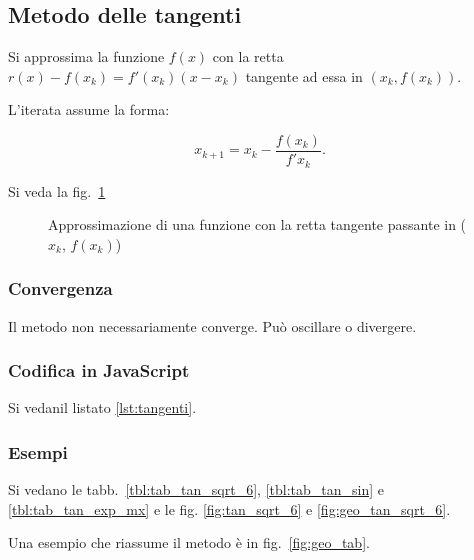 \subsection{Metodo delle tangenti}

Si approssima la funzione $f(x)$ con la retta $r(x) - f(x_k) = f'(x_k) (x - x_k)$ tangente ad essa in $(x_k, f(x_k))$.

L'iterata assume la forma:

$$x_{k+1} = x_k - \frac{f(x_k)}{f'{x_k}}.$$

Si veda la fig.~\ref{fig:retta_tangente}

\begin{figure}[!htbp]
    \begin{center}
        
        \caption{Approssimazione di una funzione con la retta tangente passante in ($x_k$, $f(x_k)$)}
        \label{fig:retta_tangente}
    \end{center}
\end{figure}


\subsubsection{Convergenza}

Il metodo non necessariamente converge.
Può oscillare o divergere.

\subsubsection{Codifica in JavaScript}


Si vedanil listato \ref{lst:tangenti}.

\begin{lstfloat}
    
    \caption{Descrizione in JavaScript del metodo delle tangenti}
    \label{lst:tangenti}
\end{lstfloat}

\subsubsection{Esempi}

Si vedano le tabb.~\ref{tbl:tab_tan_sqrt_6}, \ref{tbl:tab_tan_sin} e \ref{tbl:tab_tan_exp_mx} e le fig. \ref{fig:tan_sqrt_6} e \ref{fig:geo_tan_sqrt_6}.

Una esempio che riassume il metodo è in fig.~\ref{fig:geo_tab}.

